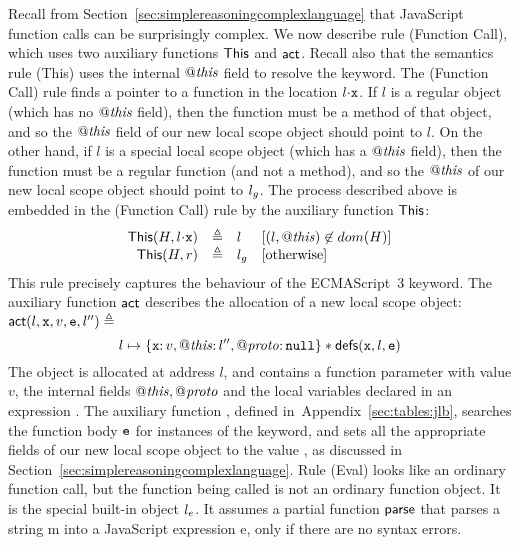 \documentclass{article}
\newcommand{\iflong}[1]{#1}
\newcommand{\ifshort}[1]{}
\begin{document}
Recall from Section~\ref{sec:simplereasoningcomplexlanguage} that
JavaScript function calls can be surprisingly complex. We now describe
rule (Function Call), which uses two auxiliary functions $\mathsf{This}$
and $\mathsf{act}$.
%
Recall also that the semantics rule (This) uses the internal $\mathit{@this}$ field to
resolve the  keyword. 
%
The (Function Call) rule finds a pointer to a function in the location
$l\sv\js{x}$. If $l$ is a regular object (which has no $\mathit{@this}$
field), then the function must be a method of that object, and so the
$\mathit{@this}$ field of our new local scope object should point to $l$. On
the other hand, if $l$ is a special local scope object (which has a
$\mathit{@this}$ field), then the function must be a regular function (and not
a method), and so the $\mathit{@this}$ of our new local scope object should
point to $l_g$. 
%
The process described above is embedded in the (Function Call) rule by the
auxiliary function $\mathsf{This}$:
%
\[\begin{array}{rlll}
        \pickThis(H,l\sv \js{x})&\triangleq &l &[(l,\thisp)\not\in dom(H)]\\
        \pickThis(H,\njs{r})&\triangleq& \lgo &[\text{otherwise}]
\end{array}\]
%
This rule precisely captures the behaviour of the ECMAScript~3  keyword.
%
The auxiliary function $\mathsf{act}$ describes the allocation of a new
local scope object:
$\mathsf{act}(l,\mbox{\texttt{{\upshape x}}},v,\mbox{\texttt{{\upshape e}}},l'') \triangleq$
%
\[l\mapsto\{\mbox{\texttt{{\upshape x}}}{:\,} v,\mathit{@this}{:\,} l'',\mathit{@proto}{:\,} \mbox{\texttt{{\upshape null}}}\}\mathbin{*} \mathsf{defs}(\mbox{\texttt{{\upshape x}}},l,\mbox{\texttt{{\upshape e}}})\]
%
The object is allocated at address $l$, and contains a function parameter
 with value $v$, the internal fields $\mathit{@this},\mathit{@proto}$ and the
local variables declared in an expression .
%
The auxiliary function , defined in~\ifshort{\cite{proofs}}\iflong{Appendix~\ref{sec:tables:jlb}},
searches the function body $\mbox{\texttt{{\upshape e}}}$ for instances of 
the  keyword, 
and
sets all the appropriate fields of our new local scope object to the
value \und, as discussed in Section~\ref{sec:simplereasoningcomplexlanguage}.
%
Rule (Eval) looks like an ordinary function call, but the function
being called is not  an ordinary function object. It is the special
built-in object $l_{e}$. It assumes a partial function $\mathsf{parse}$ that
parses a string \js m into a JavaScript expression \js e, only if
there are no syntax errors.%
%
\end{document}

